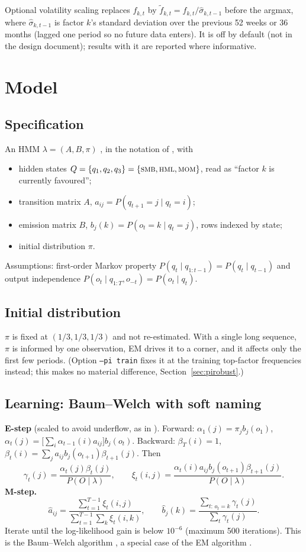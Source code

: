 \documentclass[11pt]{article}
\newcommand{\SMB}{\textsc{smb}}
\newcommand{\HML}{\textsc{hml}}
\newcommand{\MOM}{\textsc{mom}}
\begin{document}
Optional volatility scaling replaces $f_{k,t}$ by $\tilde f_{k,t}=f_{k,t}/\hat\sigma_{k,t-1}$ before the argmax, where $\hat\sigma_{k,t-1}$ is factor $k$'s standard deviation over the previous 52 weeks or 36 months (lagged one period so no future data enters). It is off by default (not in the design document); results with it are reported where informative.

\section{Model}

\subsection{Specification}
An HMM $\lambda=(A,B,\pi)$ \citep{rabiner1989,zucchini2016}, in the notation of \citet[App.~A]{jurafsky_slp3}, with
\begin{itemize}
\item hidden states $Q=\{q_1,q_2,q_3\}=\{\SMB,\HML,\MOM\}$, read as ``factor $k$ is currently favoured'';
\item transition matrix $A$, $a_{ij}=P(q_{t+1}=j\mid q_t=i)$;
\item emission matrix $B$, $b_j(k)=P(o_t=k\mid q_t=j)$, rows indexed by state;
\item initial distribution $\pi$.
\end{itemize}
Assumptions: first-order Markov property $P(q_t\mid q_{1:t-1})=P(q_t\mid q_{t-1})$ and output independence $P(o_t\mid q_{1:T},o_{-t})=P(o_t\mid q_t)$.

\subsection{Initial distribution}
$\pi$ is fixed at $(1/3,1/3,1/3)$ and not re-estimated. With a single long sequence, $\pi$ is informed by one observation, EM drives it to a corner, and it affects only the first few periods. (Option \texttt{--pi train} fixes it at the training top-factor frequencies instead; this makes no material difference, Section~\ref{sec:pirobust}.)

\subsection{Learning: Baum--Welch with soft naming}
\textbf{E-step} (scaled to avoid underflow, as in \citealp{rabiner1989}). Forward: $\alpha_1(j)=\pi_j b_j(o_1)$, $\alpha_t(j)=\big[\sum_i\alpha_{t-1}(i)a_{ij}\big]b_j(o_t)$. Backward: $\beta_T(i)=1$, $\beta_t(i)=\sum_j a_{ij}b_j(o_{t+1})\beta_{t+1}(j)$. Then
\[
\gamma_t(j)=\frac{\alpha_t(j)\beta_t(j)}{P(O\mid\lambda)},\qquad
\xi_t(i,j)=\frac{\alpha_t(i)a_{ij}b_j(o_{t+1})\beta_{t+1}(j)}{P(O\mid\lambda)}.
\]
\textbf{M-step.}
\[
\hat a_{ij}=\frac{\sum_{t=1}^{T-1}\xi_t(i,j)}{\sum_{t=1}^{T-1}\sum_k\xi_t(i,k)},\qquad
\hat b_j(k)=\frac{\sum_{t:\,o_t=k}\gamma_t(j)}{\sum_t\gamma_t(j)}.
\]
Iterate until the log-likelihood gain is below $10^{-6}$ (maximum 500 iterations). This is the Baum--Welch algorithm \citep{baum1970}, a special case of the EM algorithm \citep{dempster1977}.
\end{document}
